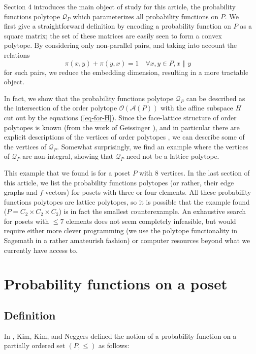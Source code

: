 \documentclass[11pt,a4paper,abstract=yes]{scrartcl}
\theoremstyle{plain}
\newcommand{\prpolytope}[1]{\mathcal{Q}_{#1}}
\newcommand{\orderpolytope}[1]{\mathcal{O}({#1})}
\newcommand{\twoanti}[1]{\mathcal{A}({#1})}
\begin{document}
Section 4 introduces the main object of study for this article, the probability functions polytope \(\prpolytope{P}\)
which parameterizes all probability functions on \(P\). We first give a straightforward definition
by encoding a probability function on \(P\) as a square matrix; the set of these matrices are easily seen
to form a convex polytope. By considering only non-parallel pairs, and taking into account the relations
\begin{equation}
\label{eq-for-H}
\pi(x,y) + \pi(y,x)=1 \quad \forall x,y \in P, x \parallel y
\end{equation}
for such pairs, we reduce the embedding dimension, resulting in a more tractable object.

In fact, we show that the probability functions polytope \(\prpolytope{P}\) can be described as the intersection of the order polytope
\(\orderpolytope{\twoanti{P}}\) with the affine subspace \(H\) cut out by the equations
(\ref{eq-for-H}). Since the face-lattice structure of order polytopes is known
(from the work of Geissinger \autocite{geissingerpolytope}), and in particular there are explicit descriptions
of the vertices of order polytopes
\autocite{StanleyTwoPosetPolytopes}\autocite{HibiEdgesOrderpolytope}\autocite{HibiCutting}, we can describe
some of the vertices of \(\prpolytope{P}\). Somewhat surprisingly, we find an example where the vertices
of \(\prpolytope{P}\) are non-integral, showing that \(\prpolytope{P}\) need not be a lattice polytope.

This example that we found is for a poset \(P\) with 8 vertices. In the last section of this article,
we list the probability functions polytopes (or rather, their edge graphs and \(f\)-vectors)
for posets with three or four elements. All these probability functions polytopes are lattice polytopes, so it is possible
that the example found (\(P=C_{2} \times C_{2} \times C_{2}\)) is in fact the smallest counterexample. An exhaustive
search for posets with \(\le 7\) elements does not seem completely infeasible, but would require either
more clever programming
(we use the polytope functionality in Sagemath \autocite{sagemath} in a rather amateurish fashion)
or computer resources beyond what we currently have access to.
\section{Probability functions on a poset}
\label{sec:orgc60bae7}
\subsection{Definition}
\label{sec:org7a53a1b}
In \autocite{neggers2019probfunc}, Kim, Kim, and Neggers defined the notion of a probability function on a partially ordered set \((P,\le)\) as follows:
\end{document}
